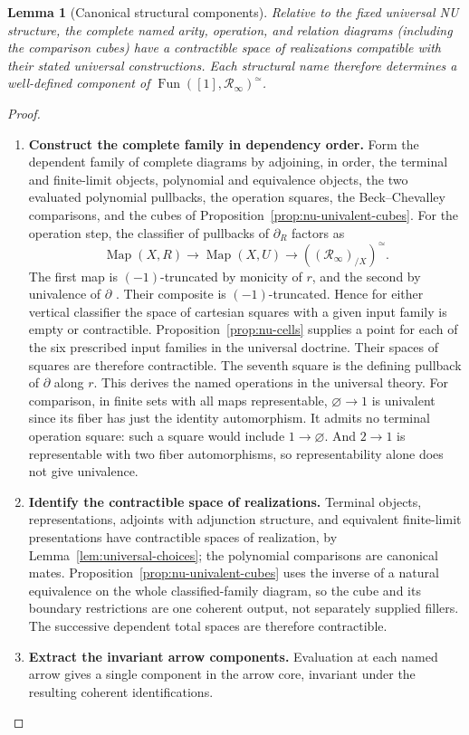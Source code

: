 \documentclass[oneside]{article}
\theoremstyle{plain}
\newtheorem{lemma}[theorem]{Lemma}
\theoremstyle{definition}
\theoremstyle{remark}
\newcommand{\Fun}{\operatorname{Fun}}
\newcommand{\Map}{\operatorname{Map}}
\newcommand{\RNU}{\mathcal R_{\infty}}
\newcommand{\core}{\simeq}
\begin{document}
\begin{lemma}[Canonical structural components]
\label{lem:canonical-realization}
Relative to the fixed universal NU structure, the complete named
arity, operation, and relation diagrams (including the comparison
cubes) have a contractible space of realizations compatible with
their stated universal constructions. Each structural name therefore
determines a well-defined component of $\Fun([1],\RNU)^\core$.
\end{lemma}
\begin{proof}
\leavevmode
\begin{enumerate}
\item \textbf{Construct the complete family in dependency order.}
Form the dependent family of complete diagrams by adjoining, in order,
the terminal and finite-limit objects, polynomial and equivalence
objects, the two evaluated polynomial pullbacks, the operation squares,
the Beck--Chevalley comparisons, and the cubes of
Proposition~\ref{prop:nu-univalent-cubes}. For the operation step,
the classifier of pullbacks of $\partial_R$ factors as
\[
 \Map(X,R)\longrightarrow\Map(X,U)
       \longrightarrow((\RNU)_{/X})^\core .
\]
The first map is $(-1)$-truncated by monicity of $r$, and the second
by univalence of $\partial$ \cite[Prop.~5.8(3)]{NguyenUemura2025}.
Their composite is $(-1)$-truncated. Hence for either vertical
classifier the space of cartesian squares with a given input family
is empty or contractible. Proposition~\ref{prop:nu-cells} supplies a
point for each of the six prescribed input families in the universal
doctrine. Their spaces of squares are therefore contractible. The
seventh square is the defining pullback of $\partial$ along $r$.
This derives the named operations in the universal theory.
For comparison, in finite sets with all maps representable,
$\varnothing\to1$ is univalent since its fiber has just the identity
automorphism. It admits no terminal operation square: such a square
would include $1\to\varnothing$. And $2\to1$ is representable with
two fiber automorphisms, so representability alone does not give
univalence. 
\item \textbf{Identify the contractible space of realizations.}
Terminal objects,
representations, adjoints with adjunction structure, and equivalent
finite-limit presentations have contractible spaces of realization,
by Lemma~\ref{lem:universal-choices}; the polynomial comparisons are
canonical mates. Proposition~\ref{prop:nu-univalent-cubes} uses the
inverse of a natural equivalence on the whole classified-family diagram,
so the cube and its boundary restrictions are one coherent output, not
separately supplied fillers. The successive dependent total spaces are
therefore contractible. 
\item \textbf{Extract the invariant arrow components.}
Evaluation at each named arrow gives a single
component in the arrow core, invariant under the resulting coherent
identifications.
\qedhere
\end{enumerate}
\end{proof}
\end{document}
